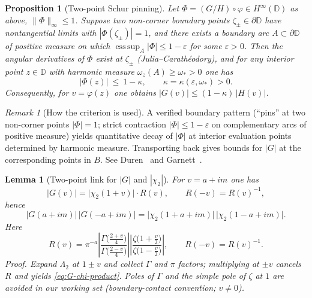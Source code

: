 \documentclass[11pt]{article}
\numberwithin{equation}{section}
\newtheorem{lemma}[theorem]{Lemma}
\newtheorem{proposition}[theorem]{Proposition}
\theoremstyle{remark}
\newtheorem{remark}[theorem]{Remark}
\newcommand{\D}{\mathbb{D}}
\newcommand{\LamTwo}{\Lambda_2}
\begin{document}
\begin{proposition}[Two-point Schur pinning]\label{prop:schur-pin}
Let $\Phi=(G/H)\circ\varphi\in H^\infty(\D)$ as above, $\|\Phi\|_\infty\le 1$. Suppose two non-corner boundary points $\zeta_\pm\in\partial\D$ have nontangential limits with $|\Phi(\zeta_\pm)|=1$, and there exists a boundary arc $A\subset\partial\D$ of positive measure on which $\operatorname*{ess\,sup}_{A}|\Phi|\le 1-\varepsilon$ for some $\varepsilon>0$. Then the angular derivatives of $\Phi$ exist at $\zeta_\pm$ (Julia--Carath\'eodory), and for any interior point $z\in\D$ with harmonic measure $\omega_z(A)\ge\omega_*>0$ one has
\[
|\Phi(z)|\ \le\ 1-\kappa,\qquad \kappa=\kappa(\varepsilon,\omega_*)>0.
\]
Consequently, for $v=\varphi(z)$ one obtains $|G(v)|\le (1-\kappa)\,|H(v)|$.
\end{proposition}
\begin{remark}[How the criterion is used]
A verified boundary pattern (“pins” at two non-corner points $|\Phi|=1$; strict contraction $|\Phi|\le 1-\varepsilon$ on complementary arcs of positive measure) yields quantitative decay of $|\Phi|$ at interior evaluation points determined by harmonic measure. Transporting back gives bounds for $|G|$ at the corresponding points in $B$. See Duren~\cite[Chs.~II, IV--V]{DurenHp} and Garnett~\cite[Chs.~II--III]{GarnettBAF}.
\end{remark}

\begin{lemma}[Two-point link for $|G|$ and $|\chi_2|$]\label{lem:G-chi-link}
For $v=a+im$ one has
\begin{equation}\label{eq:G-chi-link}
|G(v)|=\big|\chi_2(1+v)\big|\cdot R(v),\qquad R(-v)=R(v)^{-1},
\end{equation}
hence
\begin{equation}\label{eq:G-chi-product}
|G(a+im)|\,|G(-a+im)|
=\big|\chi_2(1+a+im)\big|\,\big|\chi_2(1-a+im)\big|.
\end{equation}
Here
\[
R(v)=\pi^{-a}\left|\frac{\Gamma\!\Big(\frac{2+v}{4}\Big)}{\Gamma\!\Big(\frac{2-v}{4}\Big)}\right|
\left|\frac{\zeta\!\big(1+\tfrac{v}{2}\big)}{\zeta\!\big(1-\tfrac{v}{2}\big)}\right|,
\qquad R(-v)=R(v)^{-1}.
\]
\emph{Proof.}
Expand $\LamTwo$ at $1\pm v$ and collect $\Gamma$ and $\pi$ factors; multiplying at $\pm v$ cancels $R$ and yields \eqref{eq:G-chi-product}. Poles of $\Gamma$ and the simple pole of $\zeta$ at $1$ are avoided in our working set (boundary-contact convention; $v\ne 0$).
\end{lemma}
\end{document}
